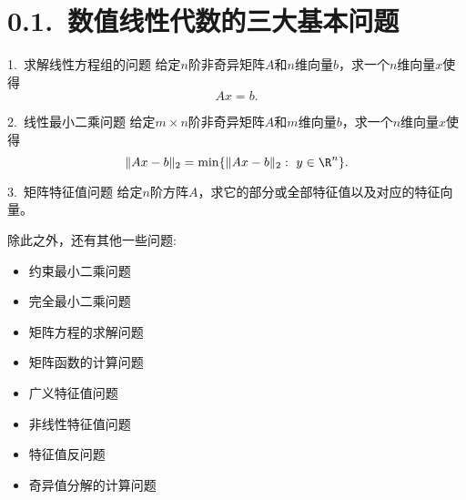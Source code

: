 \section{0.1.~数值线性代数的三大基本问题}

\begin{frame}\ft{\secname}
\begin{small}
\begin{block}{1.~求解线性方程组的问题}
给定$n$阶非奇异矩阵$A$和$n$维向量$b$，求一个$n$维向量$x$使得
$$
Ax = b.
$$
\end{block}
\pause
\begin{block}{2.~线性最小二乘问题}
给定$m\times n$阶非奇异矩阵$A$和$m$维向量$b$，求一个$n$维向量$x$使得
$$
\|Ax - b\|_2 = \min \{\|Ax - b\|_2:~ y \in \R^n \}.
$$
\end{block}
\pause
\begin{block}{3.~矩阵特征值问题}
给定$n$阶方阵$A$，求它的部分或全部特征值以及对应的特征向量。
\end{block}
\end{small}
\end{frame}


\begin{frame}\ft{\secname}
\begin{small}
除此之外，还有其他一些问题:
\begin{itemize}
\item
约束最小二乘问题
\item
完全最小二乘问题
\item
矩阵方程的求解问题
\item
矩阵函数的计算问题
\item
广义特征值问题
\item
非线性特征值问题
\item
特征值反问题
\item
奇异值分解的计算问题
\end{itemize}
\end{small}
\end{frame}
